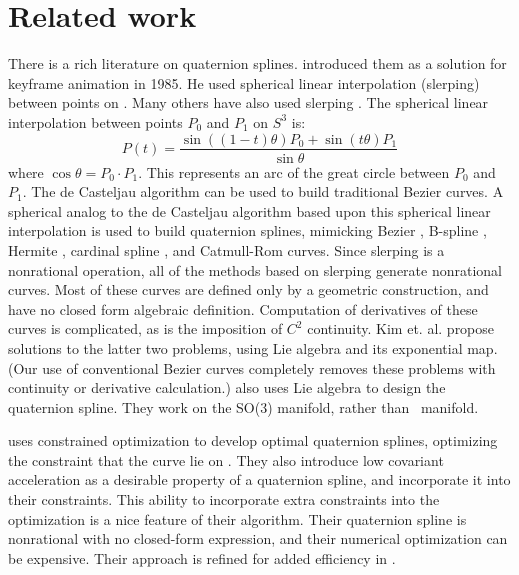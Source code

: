 \section{Related work}
\label{sec:prevwork}

There is a rich literature on quaternion splines.
\cite{shoemake85} introduced them as a solution 
for keyframe animation in 1985.
He used spherical linear interpolation (slerping) between points on .
Many others have also used slerping 
\cite{duff85,pletinckx89,schlag91,nielson92,nielson93,kim95,nam95}.
The spherical linear interpolation between points $P_0$ and $P_1$ on $S^3$ is:
\[ P(t) = \frac{\sin((1-t)\theta) P_0 + \sin(t \theta) P_1}{\sin \theta}
\]
where $\cos \theta = P_0 \cdot P_1$.
This represents an arc of the great circle between $P_0$ and $P_1$.
The de Casteljau algorithm can be used to build traditional Bezier curves.
A spherical analog to the de Casteljau algorithm based upon this
spherical linear interpolation is used to build quaternion splines,
mimicking Bezier \cite{shoemake85,kim95}, B-spline 
\cite{duff85,nielson92,nielson93,kim95}, Hermite \cite{kim95,nam95},
cardinal spline \cite{pletinckx89}, and Catmull-Rom \cite{schlag91} curves.
Since slerping is a nonrational operation,
all of the methods based on slerping generate nonrational curves.
Most of these curves are defined only by a geometric construction, and have
no closed form algebraic definition.
Computation of derivatives of these curves is complicated,
as is the imposition of $C^2$ continuity.
Kim et. al. \cite{kim95} propose solutions to the latter two problems,
using Lie algebra and its exponential map.
(Our use of conventional Bezier curves completely removes 
these problems with continuity or derivative calculation.)
\cite{park97} also uses Lie algebra to design the quaternion spline.
They work on the SO(3) manifold, rather than \ manifold.

\cite{barr92} uses constrained optimization to develop optimal
quaternion splines, optimizing the constraint that the curve lie on .
They also introduce low covariant acceleration
as a desirable property of a quaternion spline,
and incorporate it into their constraints.
This ability to incorporate extra constraints into the optimization
is a nice feature of their algorithm.
Their quaternion spline is nonrational with no closed-form expression,
and their numerical optimization can be expensive.
Their approach is refined for added efficiency in \cite{rama97}.

